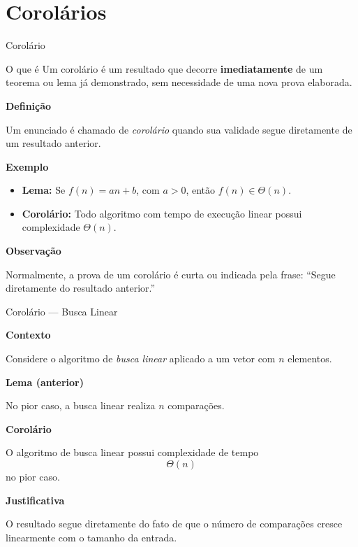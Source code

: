 \documentclass[9pt]{beamer}
\begin{document}
\section{Corolários}
\begin{frame}{Corolário}
    \begin{block}{O que é}
Um corolário é um resultado que decorre \textbf{imediatamente}
de um teorema ou lema já demonstrado, sem necessidade de uma nova prova elaborada.
    \end{block}


\textbf{Definição}

Um enunciado é chamado de \emph{corolário} quando sua validade
segue diretamente de um resultado anterior.

\vspace{0.4cm}

\textbf{Exemplo}

\begin{itemize}
\item \textbf{Lema:} Se \( f(n) = an + b \), com \( a > 0 \), então
\( f(n) \in \Theta(n) \).
\item \textbf{Corolário:} Todo algoritmo com tempo de execução linear
possui complexidade \( \Theta(n) \).
\end{itemize}

\vspace{0.4cm}

\textbf{Observação}

Normalmente, a prova de um corolário é curta ou indicada pela frase:
``Segue diretamente do resultado anterior.''

\end{frame}
\begin{frame}{Corolário — Busca Linear}

\textbf{Contexto}

Considere o algoritmo de \emph{busca linear} aplicado a um vetor
com \( n \) elementos.

\vspace{0.4cm}

\textbf{Lema (anterior)}

No pior caso, a busca linear realiza \( n \) comparações.

\vspace{0.4cm}

\textbf{Corolário}

O algoritmo de busca linear possui complexidade de tempo
\[
\Theta(n)
\]
no pior caso.

\vspace{0.4cm}

\textbf{Justificativa}

O resultado segue diretamente do fato de que o número de comparações
cresce linearmente com o tamanho da entrada.

\end{frame}
\end{document}
